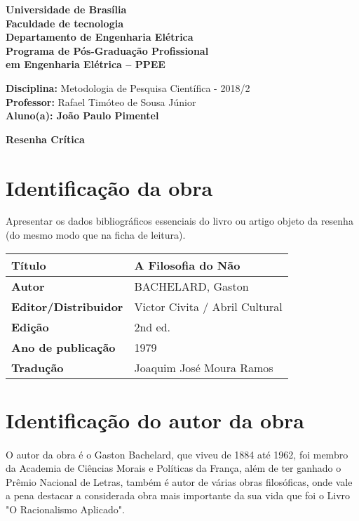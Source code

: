 \documentclass[11pt]{article}
\begin{document}
\noindent
\begin{center}
	\Large\textbf{Universidade de Brasília}\\
	\Large\textbf{Faculdade de tecnologia}\\
	\Large\textbf{Departamento de Engenharia Elétrica}\\
	\Large\textbf{Programa de Pós-Graduação Profissional \\
		em Engenharia Elétrica -- PPEE}\\
\end{center}

\large{
	\noindent
	\textbf{Disciplina:} Metodologia de Pesquisa Científica - 2018/2\\
	\textbf{Professor:} Rafael Timóteo de Sousa Júnior \\
	\textbf{Aluno(a): João Paulo Pimentel}}\\

\begin{center}
\Large\textbf{Resenha Crítica}
\end{center}
\normalsize

\section{Identificação da obra}
    Apresentar os dados bibliográficos essenciais do livro ou artigo objeto da resenha (do mesmo modo que na ficha de leitura).

\begin{center}
	\begin{tabular}{|l|l|} \hline
		\textbf{Título} & A Filosofia do Não\cite{Bachelard1979} \\ \hline
		\textbf{Autor} & BACHELARD, Gaston \\ \hline
		\textbf{Editor/Distribuidor} & Victor Civita / Abril Cultural
 \\ \hline
		\textbf{Edição} & 2nd ed. \\ \hline
		\textbf{Ano de publicação} & 1979 \\ \hline
		\textbf{Tradução} &  Joaquim José Moura Ramos \\ \hline
	\end{tabular}
\end{center}

\section{Identificação do autor da obra}

\paragraph{}
    O autor da obra é o Gaston Bachelard, que viveu de 1884 até 1962, foi membro da Academia de Ciências Morais e Políticas da França, além de ter ganhado o Prêmio Nacional de Letras, também é autor de várias obras filosóficas, onde vale a pena destacar a considerada obra mais importante da sua vida que foi o Livro "O Racionalismo Aplicado".
\end{document}
